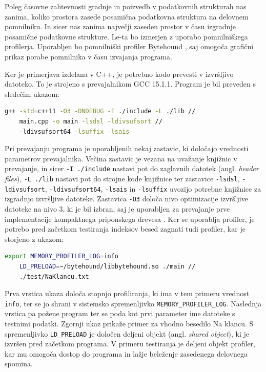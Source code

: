 Poleg časovne zahtevnosti gradnje in poizvedb v podatkovnih strukturah nas zanima, koliko prostora zasede posamična podatkovna struktura  na delovnem pomnilniku. In sicer nas zanima največji zaseden prostor v času izgradnje posamične podatkovne strukture. Le-ta bo izmerjen z uporabo pomnilniškega profilerja. Uporabljen bo pomnilniški profiler Bytehound \cite{Bytehound2024}, saj omogoča grafični prikaz porabe pomnilnika v času izvajanja programa.

Ker je primerjava izdelana v C++, je potrebno kodo prevesti v izvršljivo datoteko. To je strojeno s prevajalnikom GCC 15.1.1. Program je bil preveden s sledečim ukazom:
\begin{lstlisting}[language=bash]
    g++ -std=c++11 -O3 -DNDEBUG -I ./include -L ./lib // 
    main.cpp -o main -lsdsl -ldivsufsort //
    -ldivsufsort64 -lsuffix -lsais
\end{lstlisting}
Pri prevajanju programa je uporabljenih nekaj zastavic, ki določajo vrednosti parametrov prevajalnika. Večina zastavic je vezana na uvažanje knjižnic v prevajanje, in sicer \verb|-I ./include| nastavi pot do zaglavnih datotek (angl. \textit{header files}), \verb|-L ./lib| nastavi pot do strojne kode knjižnice ter zastavice \verb|-lsdsl|, \verb|-ldivsufsort|, \verb|-ldivsufsort64|,  \verb|-lsais| in \verb|-lsuffix| uvozijo potrebne knjižnice za izgradnjo izvršljive datoteke.
Zastavica \verb|-O3| določa nivo optimizacije izvršljive datoteke na nivo 3, ki je bil izbran, saj je uporabljen za prevajanje prve implementacije kompaktnega priponskega drevesa \cite{Valimaki2007}. Ker se uporablja profiler, je potrebo pred začetkom testiranja indeksov besed zagnati tudi profiler, kar je storjeno z ukazom:
\begin{lstlisting}[language=bash]
    export MEMORY_PROFILER_LOG=info
    LD_PRELOAD=~/bytehound/libbytehound.so ./main // 
    ./test/NaKlancu.txt 
\end{lstlisting}
Prva vrstica ukaza določa stopnjo profiliranja, ki ima v tem primeru vrednost \verb|info|, ter se jo shrani v sistemsko spremenljivko \verb|MEMORY_PROFILER_LOG|. Naslednja vrstica pa požene program ter se poda kot prvi parameter ime datoteke s testnimi podatki. Zgornji ukaz prikaže primer za vhodno besedilo Na klancu. S spremenljivko \verb|LD_PRELOAD| je določen deljeni objekt (angl. \textit{shared object}), ki je izvršen pred začetkom programa. V primeru testiranja je deljeni objekt profiler, kar mu omogoča dostop do programa in lažje beleženje zasedenega delovnega spomina.

